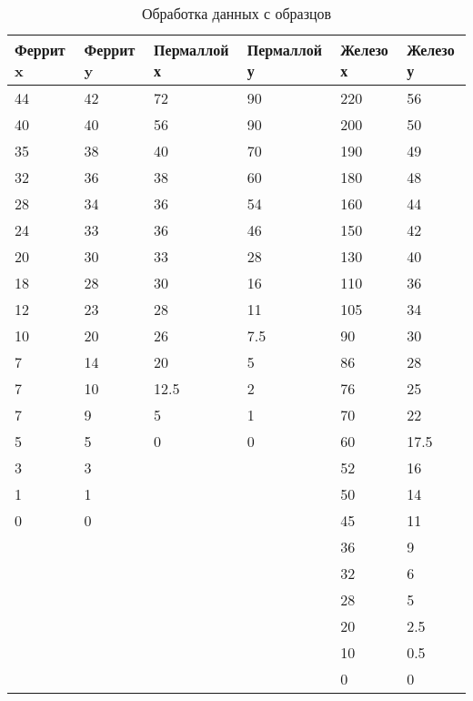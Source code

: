 \documentclass[12pt,a4paper]{article}
\begin{document}
\begin{enumerate}
    \begin{table}[H]
        \centering
        \begin{center}
        \end{center}
        \vspace{0.1cm}
        \label{tab:my_label}
        \begin{tabular}{ |p{2cm}|p{2cm}|p{2cm}|p{2cm}|p{2cm}|p{2cm}|}
     \hline
     Феррит x & Феррит y & Пермаллой х & Пермаллой у & Железо х & Железо у\\
     \hline
        44 & 42 & 72 & 90 & 220 & 56\\
     \hline
        40 & 40 & 56 & 90 & 200 & 50\\
       \hline
        35 & 38 & 40 & 70 & 190 & 49\\
       \hline
        32 & 36 & 38 & 60 & 180 & 48\\
       \hline
        28 & 34 & 36 & 54 & 160 & 44\\
        \hline
        24 & 33 & 36 & 46 & 150 & 42\\
       \hline
        20 & 30 & 33 & 28 & 130 & 40\\
       \hline
        18 & 28 & 30 & 16 & 110 & 36\\
        \hline
        12 & 23 & 28 & 11 & 105 & 34\\
        \hline
        10 & 20 & 26 & 7.5 & 90 & 30\\
        \hline
        7 & 14 & 20 & 5 & 86 & 28\\
        \hline
        7 & 10 & 12.5 & 2 & 76 & 25\\
        \hline
        7 & 9 & 5 & 1 & 70 & 22\\
        \hline
        5 & 5 & 0 & 0 & 60 & 17.5\\
        \hline
        3 & 3 & & & 52 & 16\\
        \hline
        1 & 1 & & & 50 & 14\\
        \hline
        0 & 0 & & & 45 & 11\\
        \hline
         & & & & 36 & 9\\
         \hline
         & & & & 32 & 6\\
         \hline
         & & & & 28 & 5\\
         \hline
         & & & & 20 & 2.5\\
         \hline
         & & & & 10 & 0.5\\
         \hline
         & & & & 0 & 0\\
    \hline
    \end{tabular}
    \caption{Обработка данных с образцов}
    \end{table}
    

\end{enumerate}
\end{document}
